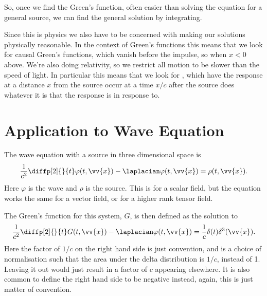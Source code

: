 So, once we find the Green's function, often easier than solving the equation for a general source, we can find the general solution by integrating.

Since this is physics we also have to be concerned with making our solutions physically reasonable.
In the context of Green's functions this means that we look for causal Green's functions, which vanish before the impulse, so when \(x < 0\) above.
We're also doing relativity, so we restrict all motion to be slower than the speed of light.
In particular this means that we look for , which have the response at a distance \(x\) from the source occur at a time \(x/c\) after the source does whatever it is that the response is in response to.

\section{Application to Wave Equation}
The wave equation with a source in three dimensional space is
\begin{equation}
    \frac{1}{c^2} \diffp[2]{}{t} \varphi(t, \vv{x}) - \laplacian \varphi(t, \vv{x}) = \rho(t, \vv{x}).
\end{equation}
Here \(\varphi\) is the wave and \(\rho\) is the source.
This is for a scalar field, but the equation works the same for a vector field, or for a higher rank tensor field.

The Green's function for this system, \(G\), is then defined as the solution to
\begin{equation}
    \frac{1}{c^2} \diffp[2]{}{t} G(t, \vv{x}) - \laplacian \varphi(t, \vv{x}) = \frac{1}{c} \delta(t) \delta^3(\vv{x}).
\end{equation}
Here the factor of \(1/c\) on the right hand side is just convention, and is a choice of normalisation such that the area under the delta distribution is \(1/c\), instead of 1.
Leaving it out would just result in a factor of \(c\) appearing elsewhere.
It is also common to define the right hand side to be negative instead, again, this is just matter of convention.

